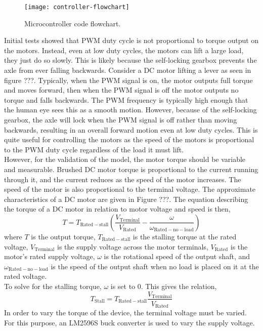 \begin{figure}[!h]
	\centering
	\texttt{[image: controller-flowchart]}
	\caption{Microcontroller code flowchart.}
	\label{fig:controller-flowchart}
\end{figure}

Initial tests showed that PWM duty cycle is not proportional to torque output on the motors. Instead, even at low duty cycles, the motors can lift a large load, they just do so slowly. This is likely because the self-locking gearbox prevents the axle from ever falling backwards. Consider a DC motor lifting a lever as seen in figure ???. Typically, when the PWM signal is on, the motor outputs full torque and moves forward, then when the PWM signal is off the motor outputs no torque and falls backwards. The PWM frequency is typically high enough that the human eye sees this as a smooth motion. However, because of the self-locking gearbox, the axle will lock when the PWM signal is off rather than moving backwards, resulting in an overall forward motion even at low duty cycles. This is quite useful for controlling the motors as the speed of the motors is proportional to the PWM duty cycle regardless of the load it must lift.\\

However, for the validation of the model, the motor torque should be variable and measurable. Brushed DC motor torque is proportional to the current running through it, and the current reduces as the speed of the motor increases. The speed of the motor is also proportional to the terminal voltage. The approximate characteristics of a DC motor are given in Figure ???. The equation describing the torque of a DC motor in relation to motor voltage and speed is then,
\begin{equation}
	T = T_\mathrm{Rated-stall}(\frac{V_\mathrm{Terminal}}{V_\mathrm{Rated}}-\frac{\omega}{\omega_\mathrm{Rated-no-load}})
\end{equation}
where $T$ is the output torque, $T_\mathrm{Rated-stall}$ is the stalling torque at the rated voltage, $V_\mathrm{Terminal}$ is the supply voltage across the motor terminals, $V_\mathrm{Rated}$ is the motor's rated supply voltage, $\omega$ is the rotational speed of the output shaft, and $\omega_\mathrm{Rated-no-load}$ is the speed of the output shaft when no load is placed on it at the rated voltage.\\

\noindent To solve for the stalling torque, $\omega$ is set to $0$. This gives the relation,
\begin{equation}
	T_\mathrm{Stall} = T_\mathrm{Rated-stall}\frac{V_\mathrm{Terminal}}{V_\mathrm{Rated}}
\end{equation}
In order to vary the torque of the device, the terminal voltage must be varied. For this purpose, an LM2596S buck converter is used to vary the supply voltage.

